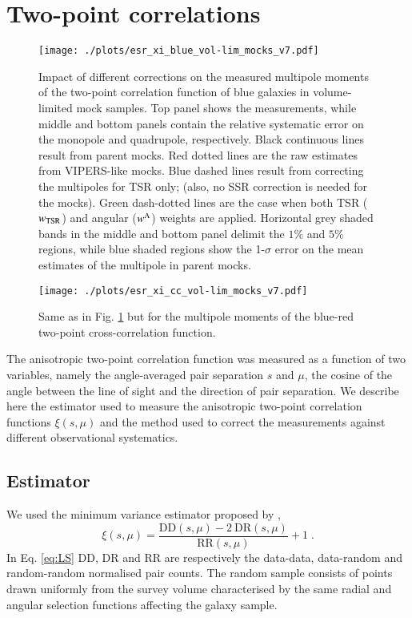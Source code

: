 \documentclass[longauth]{aa}
\def\({\left(}
\def\){\right)}
\begin{document}
\section{Two-point correlations}	\label{sec:meas}	  												%
\begin{figure}
		\centering
		\texttt{[image: ./plots/esr\_xi\_blue\_vol-lim\_mocks\_v7.pdf]}
		\caption{Impact of different corrections on the measured multipole moments of the two-point correlation function of blue galaxies in volume-limited mock samples. Top panel shows the measurements, while middle and bottom panels contain the relative systematic error on the monopole and quadrupole, respectively. Black continuous lines result from parent mocks. Red dotted lines are the raw estimates from VIPERS-like mocks. Blue dashed lines result from correcting the multipoles for TSR only; (also, no SSR correction is needed for the mocks). Green dash-dotted lines are the case when both TSR ($w_{\rm{TSR}}$) and angular ($w^{\rm{A}}$) weights are applied. Horizontal grey shaded bands in the middle and bottom panel delimit the $1\%$ and $5\%$ regions, while blue shaded regions show the 1-$\sigma$ error on the mean estimates of the multipole in parent mocks.}\label{fig:xi_blue_corr}
	\end{figure}   
	\begin{figure}
		\centering
		\texttt{[image: ./plots/esr\_xi\_cc\_vol-lim\_mocks\_v7.pdf]}
		\caption{Same as in Fig. \ref{fig:xi_blue_corr} but for the multipole moments of the blue-red two-point cross-correlation function.}\label{fig:xi_cc_corr}
	\end{figure}
The anisotropic two-point correlation function was measured as a function of two variables, namely the angle-averaged pair separation $s$ and $\mu$, the cosine of the angle between the line of sight and the direction of pair separation. We describe here the estimator used to measure the anisotropic two-point correlation functions $\xi\(s,\mu\)$ and the method used to correct the measurements against different observational systematics.

\subsection{Estimator}
We used the minimum variance estimator proposed by \citet{landy93},
	\begin{equation}
		\xi\(s,\mu\) = \frac{\mathrm{DD}\(s,\mu\)-2~\mathrm{DR}\(s,\mu\)}{\mathrm{RR}\(s,\mu\)}+1\; .					\label{eq:LS}
	\end{equation}
In Eq. \eqref{eq:LS} $\mathrm{DD}$, $\mathrm{DR}$ and $\mathrm{RR}$ are respectively the data-data, data-random and random-random normalised pair counts. The random sample consists of points drawn uniformly from the survey volume characterised by the same radial and angular selection functions affecting the galaxy sample.
\end{document}
